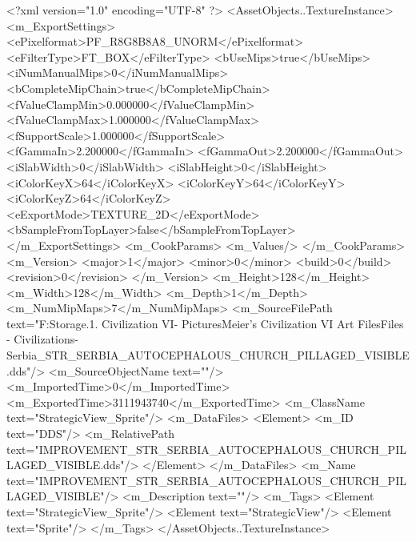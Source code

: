 <?xml version="1.0" encoding="UTF-8" ?>
<AssetObjects..TextureInstance>
	<m_ExportSettings>
		<ePixelformat>PF_R8G8B8A8_UNORM</ePixelformat>
		<eFilterType>FT_BOX</eFilterType>
		<bUseMips>true</bUseMips>
		<iNumManualMips>0</iNumManualMips>
		<bCompleteMipChain>true</bCompleteMipChain>
		<fValueClampMin>0.000000</fValueClampMin>
		<fValueClampMax>1.000000</fValueClampMax>
		<fSupportScale>1.000000</fSupportScale>
		<fGammaIn>2.200000</fGammaIn>
		<fGammaOut>2.200000</fGammaOut>
		<iSlabWidth>0</iSlabWidth>
		<iSlabHeight>0</iSlabHeight>
		<iColorKeyX>64</iColorKeyX>
		<iColorKeyY>64</iColorKeyY>
		<iColorKeyZ>64</iColorKeyZ>
		<eExportMode>TEXTURE_2D</eExportMode>
		<bSampleFromTopLayer>false</bSampleFromTopLayer>
	</m_ExportSettings>
	<m_CookParams>
		<m_Values/>
	</m_CookParams>
	<m_Version>
		<major>1</major>
		<minor>0</minor>
		<build>0</build>
		<revision>0</revision>
	</m_Version>
	<m_Height>128</m_Height>
	<m_Width>128</m_Width>
	<m_Depth>1</m_Depth>
	<m_NumMipMaps>7</m_NumMipMaps>
	<m_SourceFilePath text="F:\Mod Storage\2.1. Civilization VI\Mods\Archive - Pictures\Sid Meier's Civilization VI Art Files\Art Files - Civilizations\Civilization - Serbia\IMPROVEMENT_STR_SERBIA_AUTOCEPHALOUS_CHURCH_PILLAGED_VISIBLE.dds"/>
	<m_SourceObjectName text=""/>
	<m_ImportedTime>0</m_ImportedTime>
	<m_ExportedTime>3111943740</m_ExportedTime>
	<m_ClassName text="StrategicView_Sprite"/>
	<m_DataFiles>
		<Element>
			<m_ID text="DDS"/>
			<m_RelativePath text="IMPROVEMENT_STR_SERBIA_AUTOCEPHALOUS_CHURCH_PILLAGED_VISIBLE.dds"/>
		</Element>
	</m_DataFiles>
	<m_Name text="IMPROVEMENT_STR_SERBIA_AUTOCEPHALOUS_CHURCH_PILLAGED_VISIBLE"/>
	<m_Description text=""/>
	<m_Tags>
		<Element text="StrategicView_Sprite"/>
		<Element text="StrategicView"/>
		<Element text="Sprite"/>
	</m_Tags>
</AssetObjects..TextureInstance>

